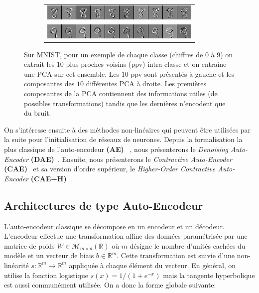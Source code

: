 \begin{figure}
\begin{subfigure}{0.45\textwidth}
\begin{tabular}{c}
  \includegraphics[width=0.90\linewidth]{predoc/images/8_eigenvectors.png}\\
  \includegraphics[width=0.90\linewidth]{predoc/images/9_eigenvectors.png}
\end{tabular}
\end{subfigure}

   \caption{Sur MNIST, pour un exemple de chaque classe (chiffres de $0$ à $9$) on
   extrait les $10$ plus proches voisins (ppv) intra-classe et on entraîne une PCA sur cet
   ensemble. Les $10$ ppv sont présentés à gauche et les
   composantes des $10$ différentes PCA à droite. Les premières composantes de
   la PCA contiennent des informations utiles (de possibles transformations)
   tandis que les dernières n'encodent que du bruit.}

\label{fig:mnistpca}
\end{figure}


On s'intéresse ensuite à des méthodes non-linéaires qui peuvent être utilisées par la suite pour
l'initialisation de réseaux de neurones.
Depuis la formalisation la plus classique de l'auto-encodeur
\textbf{(AE)}~\citep{Gallinari87} , nous présenterons le \textit{Denoising
Auto-Encoder} \textbf{(DAE)}~\citep{VincentPLarochelleH2008,Vincent-JMLR-2010}.
Ensuite, nous présenterons le \textit{Contractive Auto-Encoder}
\textbf{(CAE)}~\citep{Rifai+al-2011} et sa version d'ordre supérieur,
le \textit{Higher-Order Contractive Auto-Encoder}
\textbf{(CAE+H)}~\citep{Salah+al-2011}.

\subsection{Architectures de type Auto-Encodeur}

L'auto-encodeur classique se décompose en un encodeur et un décodeur.
L'encodeur effectue une transformation affine des données paramétrisée par une
matrice de poids $W\in\mathcal{M}_{m\times d}(\mathbb{R})$ où $m$ désigne le
nombre d'unités cachées du modèle et un vecteur de biais $b\in\mathbb{R}^m$.
Cette transformation est suivie d'une non-linéarité $s:\mathbb{R}^m \rightarrow
\mathbb{R}^m$ appliquée à chaque élément du vecteur. En général, on utilise la
fonction logistique $s(x)=1/(1+e^{-x})$ mais la tangente hyperbolique est aussi
communément utilisée. On a donc la forme globale suivante:

